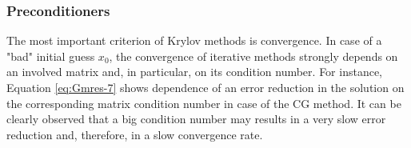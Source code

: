 













\subsubsection{Preconditioners}
\label{subseq:iterative-preconditioners}
The most important criterion of Krylov methods is convergence. In case of a "bad" initial guess $x_{0}$, the convergence of iterative methods strongly depends on an involved matrix and, in particular, on its condition number. For instance, Equation \ref{eq:Gmres-7} shows dependence of an error reduction in the solution on the corresponding matrix condition number in case of the CG method. It can be clearly observed that a big condition number may  results in a very slow error reduction and, therefore, in a slow convergence rate.\\

